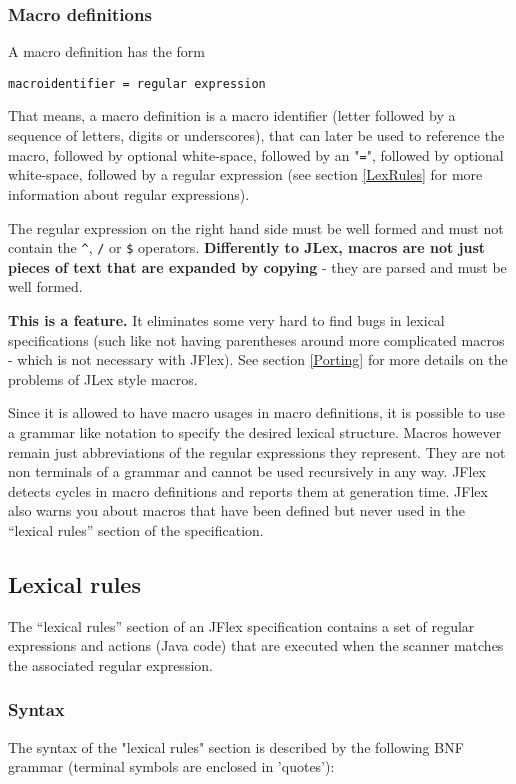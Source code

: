 \documentclass[11pt]{scrartcl}
\begin{document}
\subsubsection{Macro definitions\label{MacroDefs}}
A macro definition has the form

\texttt{macroidentifier = regular expression}

That means, a macro definition is a macro identifier (letter followed
by a sequence of letters, digits or underscores), that can later be
used to reference the macro, followed by optional white-space, followed
by an "\texttt{=}", followed by optional white-space, followed by a
regular expression (see section \ref{LexRules}  for more information about regular expressions).

The regular expression on the right hand side must be well formed and
must not contain the \verb+^+, \texttt{/} or \texttt{\$} operators. {\bf Differently
to JLex, macros are not just pieces of text that are expanded by copying}
- they are parsed and must be well formed.

{\bf This is a feature.} It eliminates some very hard to find bugs in
lexical specifications (such like not having parentheses around more
complicated macros - which is not necessary with JFlex).  See section
\ref{Porting}  for more
details on the problems of JLex style macros.

Since it is allowed to have macro usages in macro definitions, it is
possible to use a grammar like notation to specify the desired lexical
structure. Macros however remain just abbreviations of the regular expressions
they represent. They are not non terminals of a grammar and cannot be used
recursively in any way. JFlex detects cycles in macro definitions and reports
them at generation time. JFlex also warns you about macros that have been
defined but never used in the ``lexical rules'' section of the specification.
  
\subsection{Lexical rules\label{LexRules}}
The ``lexical rules'' section of an JFlex specification contains a set of
regular expressions and actions (Java code) that are executed when the
scanner matches the associated regular expression.
 
\subsubsection{Syntax\label{Grammar}}
The syntax of the "lexical rules" section is described by the following
BNF grammar (terminal symbols are enclosed in 'quotes'):
\end{document}
